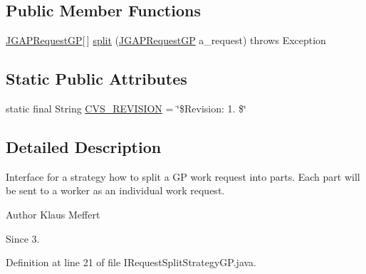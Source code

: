 \subsection*{Public Member Functions}
\begin{DoxyCompactItemize}
\item 
\hyperlink{classorg_1_1jgap_1_1distr_1_1grid_1_1gp_1_1_j_g_a_p_request_g_p}{J\-G\-A\-P\-Request\-G\-P}\mbox{[}$\,$\mbox{]} \hyperlink{interfaceorg_1_1jgap_1_1distr_1_1grid_1_1gp_1_1_i_request_split_strategy_g_p_ac978965c046ec7b8b7fb4e5a8826b935}{split} (\hyperlink{classorg_1_1jgap_1_1distr_1_1grid_1_1gp_1_1_j_g_a_p_request_g_p}{J\-G\-A\-P\-Request\-G\-P} a\-\_\-request)  throws Exception
\end{DoxyCompactItemize}
\subsection*{Static Public Attributes}
\begin{DoxyCompactItemize}
\item 
static final String \hyperlink{interfaceorg_1_1jgap_1_1distr_1_1grid_1_1gp_1_1_i_request_split_strategy_g_p_a13409b797f93bc094b310ed9c65ce6d2}{C\-V\-S\-\_\-\-R\-E\-V\-I\-S\-I\-O\-N} = \char`\"{}\$Revision\-: 1. \$\char`\"{}
\end{DoxyCompactItemize}


\subsection{Detailed Description}
Interface for a strategy how to split a G\-P work request into parts. Each part will be sent to a worker as an individual work request.

\begin{DoxyAuthor}{Author}
Klaus Meffert 
\end{DoxyAuthor}
\begin{DoxySince}{Since}
3. 
\end{DoxySince}


Definition at line 21 of file I\-Request\-Split\-Strategy\-G\-P.\-java.



